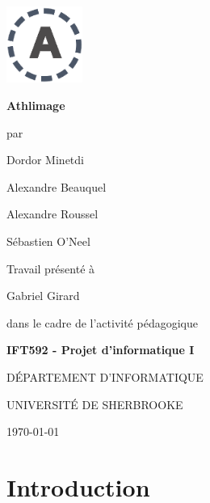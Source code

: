 \documentclass[12pt,fleqn]{article}
\renewcommand{\baselinestretch}{1.5}
\renewcommand{\baselinestretch}{1.5}
\begin{document}
\def\always{{\vcenter{\vbox{\hrule height.4pt
                   \hbox{\vrule width.4pt height9pt \kern9pt
                         \vrule width.4pt}
                         \hrule height.4pt}}}}

\def\undertext#1{$\underline{\hbox{#1}}$}



\begin{center}
\includegraphics[height=2.5cm,width=2.5cm]{images/Athlimage-logo.png}
\end{center}


\begin{center}
{\bf\LARGE    Athlimage }
\vspace{1cm}

par
\vspace{1cm}

Dordor Minetdi 

Alexandre Beauquel

Alexandre Roussel 

Sébastien O'Neel

\vspace{1cm}
{\large Travail présenté à

Gabriel Girard

\vspace{0.5cm}

 dans le cadre de l'activité pédagogique
 \vspace{0.3cm}


{\bf IFT592 - Projet d'informatique I}


\vspace{1cm}


D\'EPARTEMENT D'INFORMATIQUE

UNIVERSIT\'E DE SHERBROOKE

\vspace{0.5cm}


\today}

\end{center}

\newpage

\renewcommand{\baselinestretch}{1.2}
\normalsize


\tableofcontents

\newpage

\section{Introduction}
\end{document}

